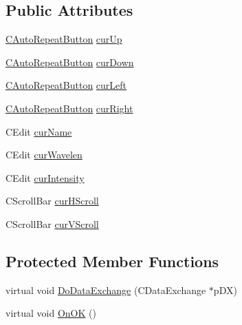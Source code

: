 \subsection*{Public Attributes}
\begin{DoxyCompactItemize}
\item 
\hyperlink{classCAutoRepeatButton}{CAutoRepeatButton} \hyperlink{classCWavlenCursor_ac14f5bebc91fcd3a4eeb7f12549013dd}{curUp}
\item 
\hyperlink{classCAutoRepeatButton}{CAutoRepeatButton} \hyperlink{classCWavlenCursor_a9f702d65da2f59fbd4c6706df6cc6026}{curDown}
\item 
\hyperlink{classCAutoRepeatButton}{CAutoRepeatButton} \hyperlink{classCWavlenCursor_a85e1c77c5d6081e1280eaedc14e56c97}{curLeft}
\item 
\hyperlink{classCAutoRepeatButton}{CAutoRepeatButton} \hyperlink{classCWavlenCursor_ae95d7b3ced6a60f010c27856af2d81e9}{curRight}
\item 
CEdit \hyperlink{classCWavlenCursor_a5b72efe6c6f8d16f4da277b46aa54ae1}{curName}
\item 
CEdit \hyperlink{classCWavlenCursor_a0552c4999c0c89d78b08df094110cbc5}{curWavelen}
\item 
CEdit \hyperlink{classCWavlenCursor_a15484409f3aa1d3b3ac8b085fac411dc}{curIntensity}
\item 
CScrollBar \hyperlink{classCWavlenCursor_a3b8b0d18fe9509298d2143dc8d175672}{curHScroll}
\item 
CScrollBar \hyperlink{classCWavlenCursor_a1f0ee0280cfb1b6ce28ab4b9b009ac75}{curVScroll}
\end{DoxyCompactItemize}
\subsection*{Protected Member Functions}
\begin{DoxyCompactItemize}
\item 
virtual void \hyperlink{classCWavlenCursor_ab1367f2dd9a4634556580f57cf6f586d}{DoDataExchange} (CDataExchange $\ast$pDX)
\item 
virtual void \hyperlink{classCWavlenCursor_a3b650952421e4ca4bfccf62e207273a2}{OnOK} ()
\end{DoxyCompactItemize}
